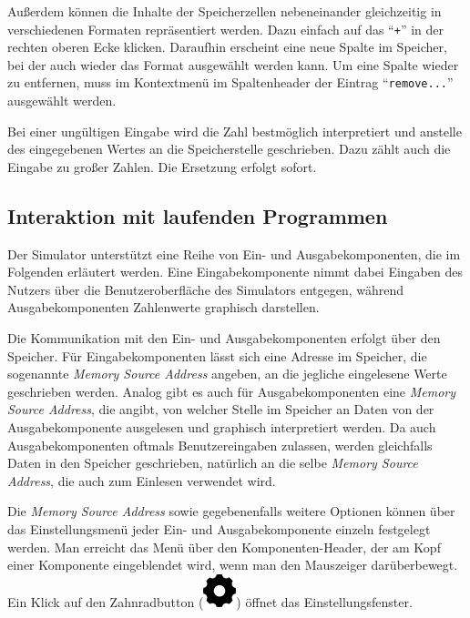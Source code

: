 Außerdem können die Inhalte der Speicherzellen nebeneinander gleichzeitig in
verschiedenen Formaten repräsentiert werden. Dazu einfach auf das ``\texttt{+}''
in der rechten oberen Ecke klicken. Daraufhin erscheint eine neue Spalte im
Speicher, bei der auch wieder das Format ausgewählt werden kann. Um eine Spalte
wieder zu entfernen, muss im Kontextmenü im Spaltenheader der Eintrag
``\texttt{remove...}'' ausgewählt werden.

\begin{warningblock}
Bei einer ungültigen Eingabe wird die Zahl bestmöglich interpretiert und
anstelle des eingegebenen Wertes an die Speicherstelle geschrieben. Dazu zählt
auch die Eingabe zu großer Zahlen. Die Ersetzung erfolgt sofort.
\end{warningblock}


\subsection{Interaktion mit laufenden Programmen}

Der Simulator unterstützt eine Reihe von Ein- und Ausgabekomponenten, die im
Folgenden erläutert werden. Eine Eingabekomponente nimmt dabei Eingaben des
Nutzers über die Benutzeroberfläche des Simulators entgegen, während
Ausgabekomponenten Zahlenwerte graphisch darstellen.

Die Kommunikation mit den Ein- und Ausgabekomponenten erfolgt über den Speicher.
Für Eingabekomponenten lässt sich eine Adresse im Speicher, die sogenannte
\textit{Memory Source Address} angeben, an die jegliche eingelesene Werte
geschrieben werden. Analog gibt es auch für Ausgabekomponenten eine
\textit{Memory Source Address}, die angibt, von welcher Stelle im Speicher an
Daten von der Ausgabekomponente ausgelesen und graphisch interpretiert werden.
Da auch Ausgabekomponenten oftmals Benutzereingaben zulassen, werden gleichfalls
Daten in den Speicher geschrieben, natürlich an die selbe \textit{Memory Source
Address}, die auch zum Einlesen verwendet wird.

Die \textit{Memory Source Address} sowie gegebenenfalls weitere Optionen können
über das Einstellungsmenü jeder Ein- und Ausgabekomponente einzeln festgelegt
werden. Man erreicht das Menü über den Komponenten-Header, der am Kopf einer
Komponente eingeblendet wird, wenn man den Mauszeiger darüberbewegt. Ein Klick
auf den Zahnradbutton (\includegraphics[scale=0.22]{Images/SettingsIcon}) öffnet
das Einstellungsfenster.

